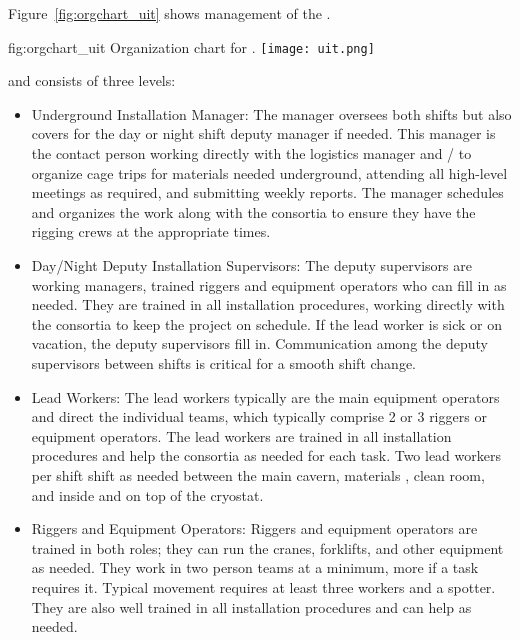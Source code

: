 Figure~\ref{fig:orgchart_uit} shows management of the . 
\begin{dunefigure}{fig:orgchart_uit}
  {Organization chart for  .}
  \texttt{[image: uit.png]}
\end{dunefigure}
and consists of three levels:
\begin{itemize}
  \item Underground Installation Manager: The  manager oversees
    both shifts but also covers for the day or night shift deputy
    manager if needed.  This manager is the contact person working directly
    with the logistics manager and \surf/ to organize cage
    trips for materials needed underground, attending all high-level
    meetings as required, and submitting weekly reports.  The  manager schedules and
    organizes the work along with the consortia to ensure they have
    the rigging crews at the appropriate times.
  \item Day/Night Deputy Installation Supervisors: The deputy
      supervisors are working managers, trained
      riggers and equipment operators who can fill in as needed.  They
      are trained in all installation procedures, working
      directly with the consortia to keep the project 
      on schedule.  If the lead worker is sick or on vacation, the deputy supervisors fill in. Communication among the deputy supervisors between
      shifts is critical for a smooth shift change.
  \item Lead Workers: The lead workers typically are the main
    equipment operators and direct the individual teams, which typically comprise 2 or 3
    riggers or equipment operators.  The lead workers are trained in all
    installation procedures and help the consortia as needed for
    each task.  Two lead workers per shift shift as
    needed between the main cavern, materials , clean room, and
    inside and on top of the cryostat.
  \item Riggers and Equipment Operators: Riggers and equipment
    operators are trained in both roles; they
    can run the cranes, forklifts, and other equipment as needed.  They
    work in two person teams at a minimum, more if a
    task requires it. Typical  movement requires at least three workers and a
    spotter. They are also well trained in all installation
    procedures and can help as needed.
\end{itemize}

